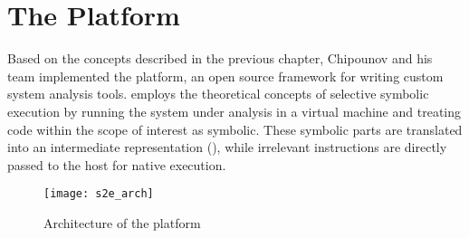 \section{The \sse Platform}\label{sec:platform}

Based on the concepts described in the previous chapter, Chipounov and his team implemented the \sse platform, an open source framework for writing custom system analysis tools.
\sse employs the theoretical concepts of selective symbolic execution by running the system under analysis in a virtual machine and treating code within the scope of interest as symbolic.
These symbolic parts are translated into an intermediate representation (), while irrelevant instructions are directly passed to the host for native execution.


\begin{figure}
\texttt{[image: s2e\_arch]}
\caption{Architecture of the \sse platform \cite{chip12s2e}}
\label{fig:arch}
\end{figure}



\iffalse
§3	The S2E Platform
		> Architektur
		> Funktionsweise
		> Selektoren + Analysatoren
\fi